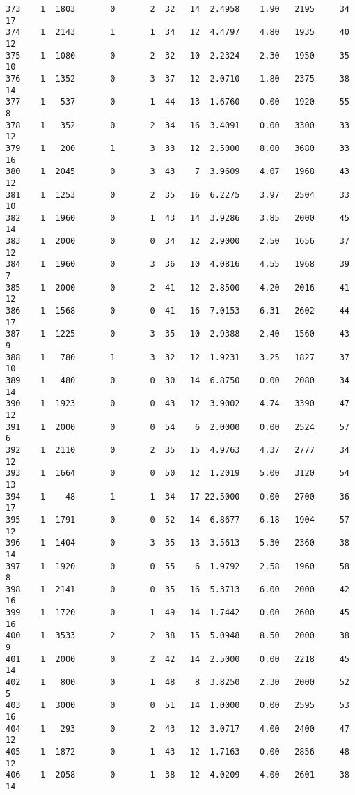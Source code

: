 \documentclass[
  letterpaper,
  DIV=11,
  numbers=noendperiod]{scrreprt}
\begin{document}
\begin{verbatim}
373    1  1803       0       2  32   14  2.4958    1.90   2195     34      17
374    1  2143       1       1  34   12  4.4797    4.80   1935     40      12
375    1  1080       0       2  32   10  2.2324    2.30   1950     35      10
376    1  1352       0       3  37   12  2.0710    1.80   2375     38      14
377    1   537       0       1  44   13  1.6760    0.00   1920     55       8
378    1   352       0       2  34   16  3.4091    0.00   3300     33      12
379    1   200       1       3  33   12  2.5000    8.00   3680     33      16
380    1  2045       0       3  43    7  3.9609    4.07   1968     43      12
381    1  1253       0       2  35   16  6.2275    3.97   2504     33      10
382    1  1960       0       1  43   14  3.9286    3.85   2000     45      14
383    1  2000       0       0  34   12  2.9000    2.50   1656     37      12
384    1  1960       0       3  36   10  4.0816    4.55   1968     39       7
385    1  2000       0       2  41   12  2.8500    4.20   2016     41      12
386    1  1568       0       0  41   16  7.0153    6.31   2602     44      17
387    1  1225       0       3  35   10  2.9388    2.40   1560     43       9
388    1   780       1       3  32   12  1.9231    3.25   1827     37      10
389    1   480       0       0  30   14  6.8750    0.00   2080     34      14
390    1  1923       0       0  43   12  3.9002    4.74   3390     47      12
391    1  2000       0       0  54    6  2.0000    0.00   2524     57       6
392    1  2110       0       2  35   15  4.9763    4.37   2777     34      12
393    1  1664       0       0  50   12  1.2019    5.00   3120     54      13
394    1    48       1       1  34   17 22.5000    0.00   2700     36      17
395    1  1791       0       0  52   14  6.8677    6.18   1904     57      12
396    1  1404       0       3  35   13  3.5613    5.30   2360     38      14
397    1  1920       0       0  55    6  1.9792    2.58   1960     58       8
398    1  2141       0       0  35   16  5.3713    6.00   2000     42      16
399    1  1720       0       1  49   14  1.7442    0.00   2600     45      16
400    1  3533       2       2  38   15  5.0948    8.50   2000     38       9
401    1  2000       0       2  42   14  2.5000    0.00   2218     45      14
402    1   800       0       1  48    8  3.8250    2.30   2000     52       5
403    1  3000       0       0  51   14  1.0000    0.00   2595     53      16
404    1   293       0       2  43   12  3.0717    4.00   2400     47      12
405    1  1872       0       1  43   12  1.7163    0.00   2856     48      12
406    1  2058       0       1  38   12  4.0209    4.00   2601     38      14

\end{verbatim}
\end{document}
